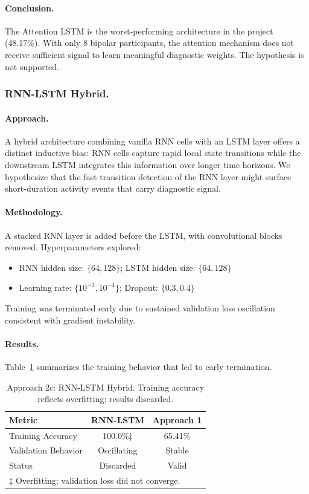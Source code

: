 \paragraph{Conclusion.}
The Attention LSTM is the worst-performing architecture in the project (48.17\%). With only 8 bipolar participants, the attention mechanism does not receive sufficient signal to learn meaningful diagnostic weights. The hypothesis is not supported.

\subsubsection{RNN-LSTM Hybrid.}

\paragraph{Approach.}
A hybrid architecture combining vanilla RNN cells with an LSTM layer offers a distinct inductive bias: RNN cells capture rapid local state transitions while the downstream LSTM integrates this information over longer time horizons. We hypothesize that the fast transition detection of the RNN layer might surface short-duration activity events that carry diagnostic signal.

\paragraph{Methodology.}
A stacked RNN layer is added before the LSTM, with convolutional blocks removed. Hyperparameters explored:
\begin{itemize}[nosep]
  \item RNN hidden size: $\{64, 128\}$; LSTM hidden size: $\{64, 128\}$
  \item Learning rate: $\{10^{-3}, 10^{-4}\}$; Dropout: $\{0.3, 0.4\}$
\end{itemize}
Training was terminated early due to sustained validation loss oscillation consistent with gradient instability.

\paragraph{Results.}
Table~\ref{tab:approach2c_results} summarizes the training behavior that led to early termination.

\begin{table}[H]
\centering
\caption{Approach 2c: RNN-LSTM Hybrid. Training accuracy reflects overfitting; results discarded.}
\label{tab:approach2c_results}
\begin{tabular}{lcc}
\toprule
\textbf{Metric} & \textbf{RNN-LSTM} & \textbf{Approach 1} \\
\midrule
Training Accuracy & 100.0\%$\ddagger$ & 65.41\% \\
Validation Behavior & Oscillating & Stable \\
Status & Discarded & Valid \\
\bottomrule
\multicolumn{3}{l}{\footnotesize $\ddagger$ Overfitting; validation loss did not converge.}
\end{tabular}
\end{table}

